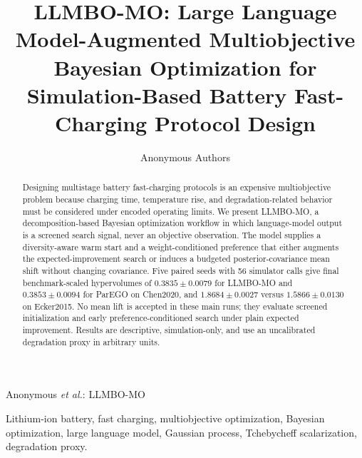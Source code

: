 \documentclass[journal]{IEEEtran}
\begin{document}
\title{LLMBO-MO: Large Language Model-Augmented Multiobjective Bayesian
Optimization for Simulation-Based Battery Fast-Charging Protocol Design}

\author{Anonymous Authors}

%
{Anonymous \MakeLowercase{\textit{et al.}}: LLMBO-MO}

\maketitle

\begin{abstract}
Designing multistage battery fast-charging protocols is an expensive
multiobjective problem because charging time, temperature rise, and
degradation-related behavior must be considered under encoded operating
limits. We present LLMBO-MO, a decomposition-based Bayesian optimization
workflow in which language-model output is a screened search signal, never an
objective observation. The model supplies a diversity-aware warm start and a
weight-conditioned preference that either augments the expected-improvement
search or induces a budgeted posterior-covariance mean shift without changing
covariance. Five paired seeds with 56 simulator calls give final
benchmark-scaled hypervolumes of $0.3835\pm0.0079$ for LLMBO-MO and
$0.3853\pm0.0094$ for ParEGO on Chen2020, and $1.8684\pm0.0027$ versus
$1.5866\pm0.0130$ on Ecker2015. No mean lift is accepted in these main runs;
they evaluate screened initialization and early preference-conditioned search
under plain expected improvement. Results are descriptive, simulation-only,
and use an uncalibrated degradation proxy in arbitrary units.
\end{abstract}

\begin{IEEEkeywords}
Lithium-ion battery, fast charging, multiobjective optimization, Bayesian
optimization, large language model, Gaussian process, Tchebycheff
scalarization, degradation proxy.
\end{IEEEkeywords}

\IEEEpeerreviewmaketitle







\end{document}
